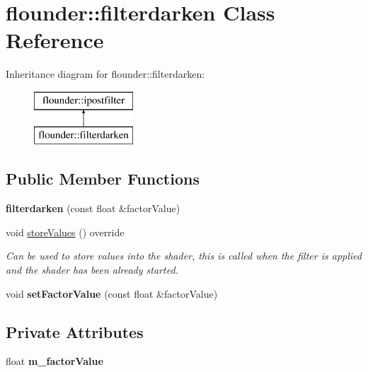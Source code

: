 \hypertarget{classflounder_1_1filterdarken}{}\section{flounder\+:\+:filterdarken Class Reference}
\label{classflounder_1_1filterdarken}
Inheritance diagram for flounder\+:\+:filterdarken\+:\begin{figure}[H]
\begin{center}
\leavevmode
\includegraphics[height=2.000000cm]{classflounder_1_1filterdarken}
\end{center}
\end{figure}
\subsection*{Public Member Functions}
\begin{DoxyCompactItemize}
\item 
\mbox{\label{classflounder_1_1filterdarken_a89b9c01e377def190a9174e9f7209682}} 
{\bfseries filterdarken} (const float \&factor\+Value)
\item 
void \hyperlink{classflounder_1_1filterdarken_a5cee7990cb4de781465cf43f4695e823}{store\+Values} () override
\begin{DoxyCompactList}\small\item\em Can be used to store values into the shader, this is called when the filter is applied and the shader has been already started. \end{DoxyCompactList}\item 
\mbox{\label{classflounder_1_1filterdarken_ad78cb798abfe2e4f0f0c5356fbf4aba6}} 
void {\bfseries set\+Factor\+Value} (const float \&factor\+Value)
\end{DoxyCompactItemize}
\subsection*{Private Attributes}
\begin{DoxyCompactItemize}
\item 
\mbox{\label{classflounder_1_1filterdarken_a43f1497c8d60f906b1290152231bc4dc}} 
float {\bfseries m\+\_\+factor\+Value}
\end{DoxyCompactItemize}
